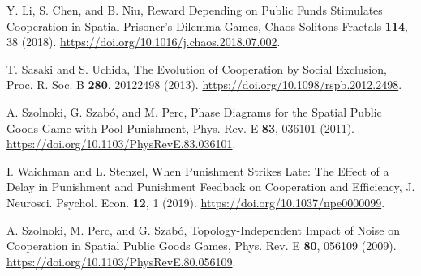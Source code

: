 \begin{thebibliography}{04}
Y. Li, S. Chen, and B. Niu, Reward Depending on Public Funds Stimulates Cooperation in Spatial Prisoner’s Dilemma Games, Chaos Solitons Fractals \textbf{114}, 38 (2018). \url{https://doi.org/10.1016/j.chaos.2018.07.002}.

T. Sasaki and S. Uchida, The Evolution of Cooperation by Social Exclusion, Proc. R. Soc. B \textbf{280}, 20122498 (2013). \url{https://doi.org/10.1098/rspb.2012.2498}.

A. Szolnoki, G. Szabó, and M. Perc, Phase Diagrams for the Spatial Public Goods Game with Pool Punishment, Phys. Rev. E \textbf{83}, 036101 (2011). \url{https://doi.org/10.1103/PhysRevE.83.036101}.

I. Waichman and L. Stenzel, When Punishment Strikes Late: The Effect of a Delay in Punishment and Punishment Feedback on Cooperation and Efficiency, J. Neurosci. Psychol. Econ. \textbf{12}, 1 (2019). \url{https://doi.org/10.1037/npe0000099}.

A. Szolnoki, M. Perc, and G. Szabó, Topology-Independent Impact of Noise on Cooperation in Spatial Public Goods Games, Phys. Rev. E \textbf{80}, 056109 (2009). \url{https://doi.org/10.1103/PhysRevE.80.056109}.



\end{thebibliography}







